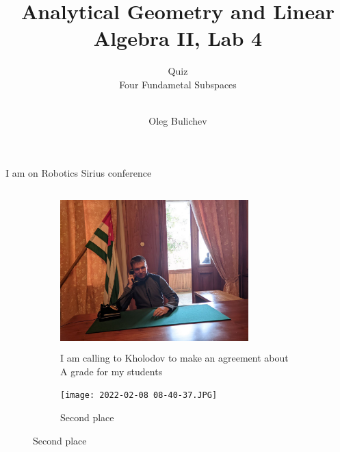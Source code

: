 \documentclass[aspectratio=169]{beamer}
\title[AGLA2]{Analytical Geometry and Linear Algebra II, Lab 4} %
\subtitle{Quiz \\ Four Fundametal Subspaces \\ \ 
         } %
\author{Oleg Bulichev}
\newcommand{\fbckg}[1]{\usebackgroundtemplate{\texttt{[image: \#1]}}}%
\begin{document}
\fbckg{fibeamer/figs/title_page.png}

\fbckg{fibeamer/figs/common.png}

\begin{frame}[t]{I am on Robotics Sirius conference}
\framesubtitle{}
    \vspace{-0.4cm}
    \begin{figure}[H]
        \begin{subfigure}{0.59\textwidth}
            \centering\includegraphics[height=6cm,width=0.8\textwidth,keepaspectratio]{2022-01-30 21-16-53.JPG}
            \caption*{\Large I am calling to Kholodov to make an agreement about A grade for my students}
            \label{fig:2022-01-30 21-16-53.JPG}
        \end{subfigure}
        \begin{subfigure}{0.39\textwidth}
            \centering\texttt{[image: 2022-02-08 08-40-37.JPG]}
            \caption*{\Large Second place}
            \label{fig:2022-02-08 08-40-37.JPG}
        \end{subfigure}
    
    \label{fig:meow}
    \end{figure}
\end{frame}
\end{document}
